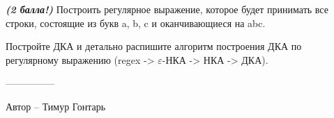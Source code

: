\question
\textbf{\textit{(2 балла!)}} Построить регулярное выражение, которое будет принимать все строки, состоящие из букв a, b, c и оканчивающиеся на abc.

Постройте ДКА и детально распишите алгоритм построения ДКА по регулярному выражению (regex -> $\varepsilon$-НКА -> НКА -> ДКА).

---------------

Автор -- Тимур Гонтарь
